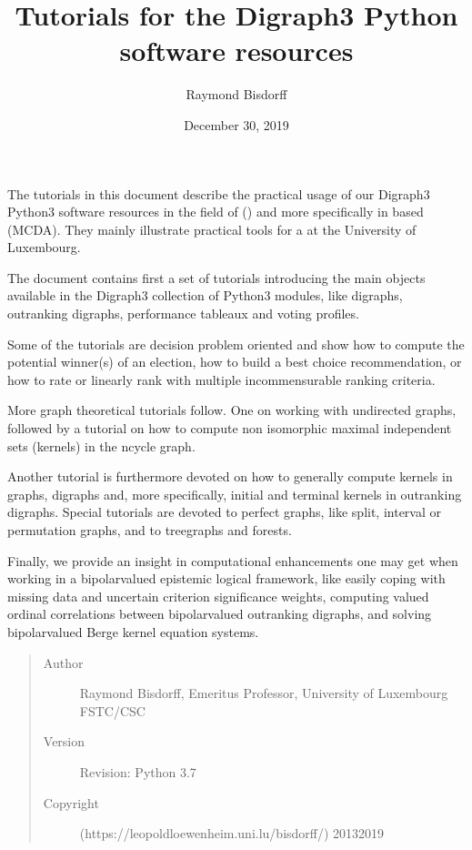 \documentclass[a4paper,10pt,english]{sphinxhowto}
\title{Tutorials for the Digraph3 Python software resources}
\date{December 30, 2019}
\author{Raymond Bisdorff}
\begin{document}
\pagestyle{empty}
\sphinxmaketitle
\pagestyle{plain}
\sphinxtableofcontents
\pagestyle{normal}
\label{\detokenize{tutorial::doc}}



The tutorials in this document describe the practical usage of our Digraph3 Python3 software resources in the field of  () and more specifically in  based  (MCDA). They mainly illustrate practical tools for a  at the University of Luxembourg.

The document contains first a set of tutorials introducing the main objects available in the Digraph3 collection of Python3 modules, like digraphs, outranking digraphs, performance tableaux and voting profiles.

Some of the tutorials are decision problem oriented and show how to compute the potential winner(s) of an election, how to build a best choice recommendation, or how to rate or linearly rank with multiple incommensurable ranking criteria.

More graph theoretical tutorials follow. One on working with undirected graphs, followed by a tutorial on how to compute non isomorphic maximal independent sets (kernels) in the n\sphinxhyphen{}cycle graph.

Another tutorial is furthermore devoted on how to generally compute kernels in graphs, digraphs and, more specifically, initial and terminal kernels in outranking digraphs. Special tutorials are devoted to perfect graphs, like split, interval or permutation graphs, and to tree\sphinxhyphen{}graphs and forests.

Finally, we provide an insight in computational enhancements one may get when working in a bipolar\sphinxhyphen{}valued epistemic logical framework, like easily coping with missing data and uncertain criterion significance weights, computing valued ordinal correlations between bipolar\sphinxhyphen{}valued outranking digraphs, and solving bipolar\sphinxhyphen{}valued Berge kernel equation systems.
\begin{quote}\begin{description}
\item[{Author}] \leavevmode
Raymond Bisdorff, Emeritus Professor, University of Luxembourg FSTC/CSC

\item[{Version}] \leavevmode
Revision: Python 3.7

\item[{Copyright}] \leavevmode
{} (https://leopold\sphinxhyphen{}loewenheim.uni.lu/bisdorff/) 2013\sphinxhyphen{}2019

\end{description}\end{quote}
\label{\detokenize{tutorial:tutorial-label}}
\end{document}
